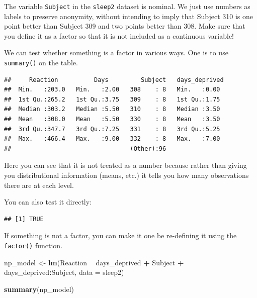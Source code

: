 \documentclass[]{book}
\newenvironment{Shaded}{\begin{snugshade}}{\end{snugshade}}
\newcommand{\DataTypeTok}[1]{\textcolor[rgb]{0.13,0.29,0.53}{#1}}
\newcommand{\KeywordTok}[1]{\textcolor[rgb]{0.13,0.29,0.53}{\textbf{#1}}}
\newcommand{\NormalTok}[1]{#1}
\newcommand{\OperatorTok}[1]{\textcolor[rgb]{0.81,0.36,0.00}{\textbf{#1}}}
\newcommand{\StringTok}[1]{\textcolor[rgb]{0.31,0.60,0.02}{#1}}
\begin{document}
The variable \texttt{Subject} in the \texttt{sleep2} dataset is nominal. We just use numbers as labels to preserve anonymity, without intending to imply that Subject 310 is one point better than Subject 309 and two points better than 308. Make sure that you define it as a factor so that it is not included as a continuous variable!

We can test whether something is a factor in various ways. One is to use \texttt{summary()} on the table.

\begin{Shaded}
\end{Shaded}

\begin{verbatim}
##     Reaction          Days         Subject   days_deprived 
##  Min.   :203.0   Min.   :2.00   308    : 8   Min.   :0.00  
##  1st Qu.:265.2   1st Qu.:3.75   309    : 8   1st Qu.:1.75  
##  Median :303.2   Median :5.50   310    : 8   Median :3.50  
##  Mean   :308.0   Mean   :5.50   330    : 8   Mean   :3.50  
##  3rd Qu.:347.7   3rd Qu.:7.25   331    : 8   3rd Qu.:5.25  
##  Max.   :466.4   Max.   :9.00   332    : 8   Max.   :7.00  
##                                 (Other):96
\end{verbatim}

Here you can see that it is not treated as a number because rather than giving you distributional information (means, etc.) it tells you how many observations there are at each level.

You can also test it directly:

\begin{Shaded}
\end{Shaded}

\begin{verbatim}
## [1] TRUE
\end{verbatim}

If something is not a factor, you can make it one be re-defining it using the \texttt{factor()} function.

\begin{Shaded}
\begin{Highlighting}[]
\NormalTok{np_model <-}\StringTok{ }\KeywordTok{lm}\NormalTok{(Reaction }\OperatorTok{~}\StringTok{ }\NormalTok{days_deprived }\OperatorTok{+}\StringTok{ }\NormalTok{Subject }\OperatorTok{+}\StringTok{ }\NormalTok{days_deprived}\OperatorTok{:}\NormalTok{Subject,}
               \DataTypeTok{data =}\NormalTok{ sleep2)}

\KeywordTok{summary}\NormalTok{(np_model)}
\end{Highlighting}
\end{Shaded}
\end{document}
